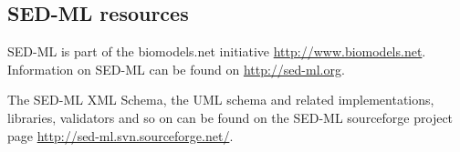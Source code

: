 \subsection{SED-ML resources}

SED-ML is part of the biomodels.net initiative \url{http://www.biomodels.net}. Information on SED-ML can be found on \url{http://sed-ml.org}.

The SED-ML XML Schema, the UML schema and related implementations, libraries, validators and so on can be found on the SED-ML sourceforge project page \url{http://sed-ml.svn.sourceforge.net/}.



